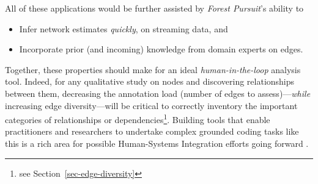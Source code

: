\documentclass[%
	12pt,
		oneside,
		letterpaper
]{book}
\providecommand{\tightlist}{%
  \setlength{\itemsep}{0pt}\setlength{\parskip}{0pt}}\usepackage{longtable,booktabs,array}
\begin{document}
All of these applications would be further assisted by \emph{Forest
Pursuit}'s ability to

\begin{itemize}
\tightlist
\item
  Infer network estimates \emph{quickly}, on streaming data, and
\item
  Incorporate prior (and incoming) knowledge from domain experts on
  edges.
\end{itemize}

Together, these properties should make for an ideal
\emph{human-in-the-loop} analysis tool. Indeed, for any qualitative
study on nodes and discovering relationships between them, decreasing
the annotation load (number of edges to assess)---\emph{while}
increasing edge diversity---will be critical to correctly inventory the
important categories of relationships or dependencies\footnote{see
  Section~\ref{sec-edge-diversity}}. Building tools that enable
practitioners and researchers to undertake complex grounded coding
\autocite{codingmanualqualitative_Saldana2021} tasks like this is a rich
area for possible Human-Systems Integration efforts going forward
\autocite{Humanlooptechnical_Fung2024,AIInformedApproaches_Harper2022}.


\singlespacing
\printbibliography

\doublespacing
\end{document}
